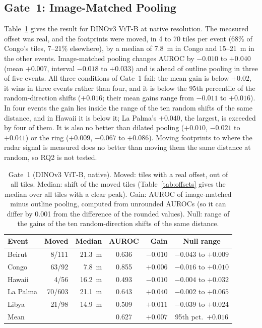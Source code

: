 \documentclass[journal]{IEEEtran}
\begin{document}
\subsection{Gate~1: Image-Matched Pooling}
\label{sec:res-gate1}
Table~\ref{tab:gate1} gives the result for DINOv3 ViT-B at native resolution. The measured offset was real, and the footprints were moved, in 4 to 70 tiles per event (68\% of Congo's tiles, 7--21\% elsewhere), by a median of 7.8~m in Congo and 15--21~m in the other events. Image-matched pooling changes AUROC by $-0.010$ to $+0.040$ (mean $+0.007$, interval $-0.018$ to $+0.033$) and is ahead of outline pooling in three of five events. All three conditions of Gate~1 fail: the mean gain is below $+0.02$, it wins in three events rather than four, and it is below the 95th percentile of the random-direction shifts ($+0.016$; their mean gains range from $-0.011$ to $+0.016$). In four events the gain lies inside the range of the ten random shifts of the same distance, and in Hawaii it is below it; La Palma's $+0.040$, the largest, is exceeded by four of them. It is also no better than dilated pooling ($+0.010$, $-0.021$ to $+0.041$) or the ring ($+0.009$, $-0.067$ to $+0.086$). Moving footprints to where the radar signal is measured does no better than moving them the same distance at random, so RQ2 is not tested.

\begin{table}[t]
\centering
\caption{Gate~1 (DINOv3 ViT-B, native). Moved: tiles with a real offset, out of all tiles. Median: shift of the moved tiles (Table~\ref{tab:offsets} gives the median over all tiles with a clear peak). Gain: AUROC of image-matched minus outline pooling, computed from unrounded AUROCs (so it can differ by 0.001 from the difference of the rounded values). Null: range of the gains of the ten random-direction shifts of the same distance.}
\label{tab:gate1}
\footnotesize
\setlength{\tabcolsep}{2.5pt}
\begin{tabular}{@{}lrrcrc@{}}
\toprule
Event & Moved & Median & AUROC & Gain & Null range \\
\midrule
Beirut & 8/111 & 21.3~m & 0.636 & $-0.010$ & $-0.043$ to $+0.009$ \\
Congo & 63/92 & 7.8~m & 0.855 & $+0.006$ & $-0.016$ to $+0.010$ \\
Hawaii & 4/56 & 16.2~m & 0.493 & $-0.010$ & $-0.004$ to $+0.032$ \\
La Palma & 70/603 & 21.1~m & 0.643 & $+0.040$ & $-0.002$ to $+0.065$ \\
Libya & 21/98 & 14.9~m & 0.509 & $+0.011$ & $-0.039$ to $+0.024$ \\
\midrule
Mean & & & 0.627 & $+0.007$ & 95th pct.\ $+0.016$ \\
\bottomrule
\end{tabular}
\end{table}
\end{document}
